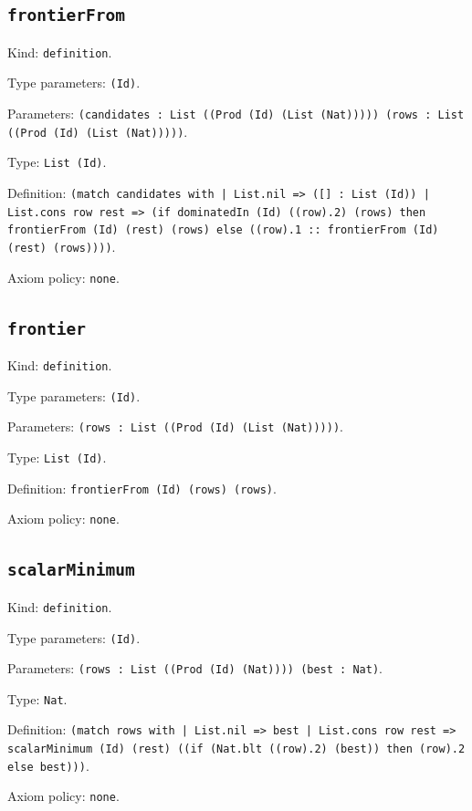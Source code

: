 \documentclass[11pt]{article}
\begin{document}
\subsection*{\texttt{frontierFrom}}
\noindent Kind: \texttt{definition}.\par
\noindent Type parameters: \texttt{(Id)}.\par
\noindent Parameters: \texttt{(candidates : List ((Prod (Id) (List (Nat))))) (rows : List ((Prod (Id) (List (Nat)))))}.\par
\noindent Type: \texttt{List (Id)}.\par
\noindent Definition: \texttt{(match candidates with | List.nil => ([] : List (Id)) | List.cons row rest => (if dominatedIn (Id) ((row).2) (rows) then frontierFrom (Id) (rest) (rows) else ((row).1 :: frontierFrom (Id) (rest) (rows))))}.\par
\noindent Axiom policy: \texttt{none}.\par
\subsection*{\texttt{frontier}}
\noindent Kind: \texttt{definition}.\par
\noindent Type parameters: \texttt{(Id)}.\par
\noindent Parameters: \texttt{(rows : List ((Prod (Id) (List (Nat)))))}.\par
\noindent Type: \texttt{List (Id)}.\par
\noindent Definition: \texttt{frontierFrom (Id) (rows) (rows)}.\par
\noindent Axiom policy: \texttt{none}.\par
\subsection*{\texttt{scalarMinimum}}
\noindent Kind: \texttt{definition}.\par
\noindent Type parameters: \texttt{(Id)}.\par
\noindent Parameters: \texttt{(rows : List ((Prod (Id) (Nat)))) (best : Nat)}.\par
\noindent Type: \texttt{Nat}.\par
\noindent Definition: \texttt{(match rows with | List.nil => best | List.cons row rest => scalarMinimum (Id) (rest) ((if (Nat.blt ((row).2) (best)) then (row).2 else best)))}.\par
\noindent Axiom policy: \texttt{none}.\par
\end{document}
